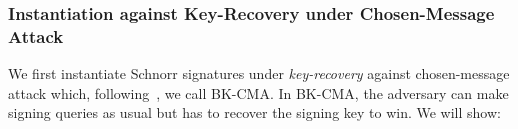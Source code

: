 \subsubsection{Instantiation    against Key-Recovery under Chosen-Message Attack} \label{sec-kr}

We first instantiate Schnorr signatures under \emph{key-recovery} against chosen-message attack which, following~\cite{AC:PaiVer05}, we call BK-CMA. In  BK-CMA,  the adversary can make signing queries  as usual but has to  recover the signing key to win. We will show: %

